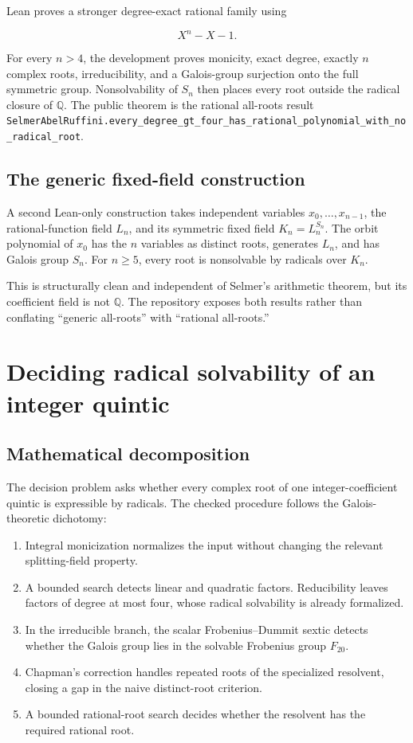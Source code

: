 \documentclass[
  10pt,
  a4paper,
  twoside,
  open=any,
  parskip=half,
  headings=big
]{scrreprt}
\newcommand{\breakcode}[1]{{\ttfamily\nolinkurl{#1}}}
\begin{document}
Lean proves a stronger degree-exact rational family using

\[
X^n-X-1.
\]

For every \(n>4\), the development proves monicity, exact degree, exactly \(n\) complex roots, irreducibility, and a Galois-group surjection onto the full symmetric group. Nonsolvability of \(S_n\) then places every root outside the radical closure of \(\mathbb Q\). The public theorem is the rational all-roots result \breakcode{SelmerAbelRuffini.every_degree_gt_four_has_rational_polynomial_with_no_radical_root}.

\subsection{The generic fixed-field construction}

A second Lean-only construction takes independent variables \(x_0,\ldots,x_{n-1}\), the rational-function field \(L_n\), and its symmetric fixed field \(K_n=L_n^{S_n}\). The orbit polynomial of \(x_0\) has the \(n\) variables as distinct roots, generates \(L_n\), and has Galois group \(S_n\). For \(n\ge5\), every root is nonsolvable by radicals over \(K_n\).

This is structurally clean and independent of Selmer's arithmetic theorem, but its coefficient field is not \(\mathbb Q\). The repository exposes both results rather than conflating ``generic all-roots'' with ``rational all-roots.''

\section{Deciding radical solvability of an integer quintic}

\subsection{Mathematical decomposition}

The decision problem asks whether every complex root of one integer-coefficient quintic is expressible by radicals. The checked procedure follows the Galois-theoretic dichotomy:

\begin{enumerate}
  \item Integral monicization normalizes the input without changing the relevant splitting-field property.
  \item A bounded search detects linear and quadratic factors. Reducibility leaves factors of degree at most four, whose radical solvability is already formalized.
  \item In the irreducible branch, the scalar Frobenius--Dummit sextic detects whether the Galois group lies in the solvable Frobenius group \(F_{20}\).
  \item Chapman's correction handles repeated roots of the specialized resolvent, closing a gap in the naive distinct-root criterion.
  \item A bounded rational-root search decides whether the resolvent has the required rational root.
\end{enumerate}
\end{document}
